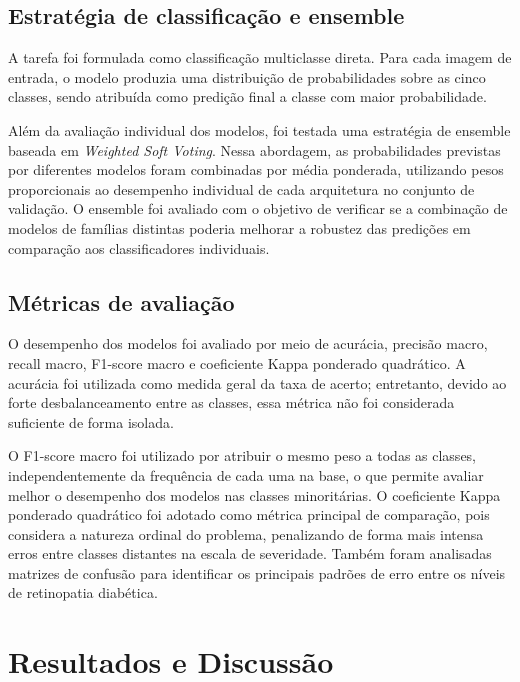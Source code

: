 \documentclass[conference]{IEEEtran}
\begin{document}
\subsection{Estrat\'egia de classifica\c{c}\~ao e ensemble}

A tarefa foi formulada como classifica\c{c}\~ao multiclasse direta. Para
cada imagem de entrada, o modelo produzia uma distribui\c{c}\~ao de
probabilidades sobre as cinco classes, sendo atribu\'ida como
predi\c{c}\~ao final a classe com maior probabilidade.

Al\'em da avalia\c{c}\~ao individual dos modelos, foi testada uma
estrat\'egia de ensemble baseada em \textit{Weighted Soft Voting}. Nessa
abordagem, as probabilidades previstas por diferentes modelos foram
combinadas por m\'edia ponderada, utilizando pesos proporcionais ao
desempenho individual de cada arquitetura no conjunto de valida\c{c}\~ao.
O ensemble foi avaliado com o objetivo de verificar se a combina\c{c}\~ao
de modelos de fam\'ilias distintas poderia melhorar a robustez das
predi\c{c}\~oes em compara\c{c}\~ao aos classificadores individuais.

\subsection{M\'etricas de avalia\c{c}\~ao}

O desempenho dos modelos foi avaliado por meio de acur\'acia,
precis\~ao macro, recall macro, F1-score macro e coeficiente Kappa
ponderado quadr\'atico. A acur\'acia foi utilizada como medida geral da
taxa de acerto; entretanto, devido ao forte desbalanceamento entre as
classes, essa m\'etrica n\~ao foi considerada suficiente de forma
isolada.

O F1-score macro foi utilizado por atribuir o mesmo peso a todas as
classes, independentemente da frequ\^encia de cada uma na base, o que
permite avaliar melhor o desempenho dos modelos nas classes
minorit\'arias. O coeficiente Kappa ponderado quadr\'atico foi adotado
como m\'etrica principal de compara\c{c}\~ao, pois considera a natureza
ordinal do problema, penalizando de forma mais intensa erros entre
classes distantes na escala de severidade. Tamb\'em foram analisadas
matrizes de confus\~ao para identificar os principais padr\~oes de erro
entre os n\'iveis de retinopatia diab\'etica.

\section{Resultados e Discuss\~ao}
\end{document}
